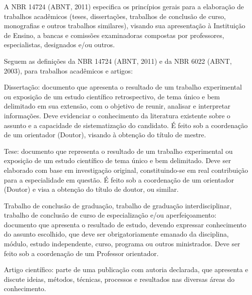 \documentclass[a4paper,12pt]{article}  %
\begin{document}
\begin{ElementosTextuais}
\begin{Introducao}
\end{Introducao}

\begin{Desenvolvimento} %

A NBR 14724 (ABNT, 2011) especifica os princípios gerais para a elaboração de trabalhos acadêmicos (teses, dissertações, trabalhos de conclusão de curso, monografias e outros trabalhos similares), visando sua apresentação à Instituição de Ensino, a bancas e comissões examinadoras compostas por professores, especialistas, designados e/ou outros.

Seguem as definições da NBR 14724 (ABNT, 2011) e da NBR 6022 (ABNT, 2003), para trabalhos acadêmicos e artigos:

\begin{alinea}
    \item Dissertação: documento que apresenta o resultado de um trabalho experimental ou exposição de um estudo científico retrospectivo, de tema único e bem delimitado em sua extensão, com o objetivo de reunir, analisar e interpretar informações. Deve evidenciar o conhecimento da literatura existente sobre o assunto e a capacidade de sistematização do candidato. É feito sob a coordenação de um orientador (Doutor), visando à obtenção do título de mestre.
    \item Tese: documento que representa o resultado de um trabalho experimental ou exposição de um estudo científico de tema único e bem delimitado. Deve ser elaborado com base em investigação original, constituindo-se em real contribuição para a especialidade em questão. É feito sob a coordenação de um orientador (Doutor) e visa a obtenção do título de doutor, ou similar.
    \item Trabalho de conclusão de graduação, trabalho de graduação interdisciplinar, trabalho de conclusão de curso de especialização e/ou aperfeiçoamento: documento que apresenta o resultado de estudo, devendo expressar conhecimento do assunto escolhido, que deve ser obrigatoriamente emanado da disciplina, módulo, estudo independente, curso, programa ou outros ministrados. Deve ser feito sob a coordenação de um Professor orientador.
    \item Artigo científico: parte de uma publicação com autoria declarada, que apresenta e discute ideias, métodos, técnicas, processos e resultados nas diversas áreas do conhecimento.
\end{alinea}


\end{Desenvolvimento}
\end{ElementosTextuais}
\end{document}
